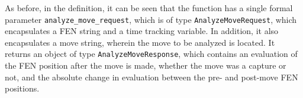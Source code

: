 As before, in the definition, it can be seen that the function has a single formal parameter
\texttt{analyze\_move\_request}, which is of type \texttt{AnalyzeMoveRequest}, which encapsulates a FEN string and a
time tracking variable.
In addition, it also encapsulates a move string, wherein the move to be analyzed is located.
It returns an object of type \texttt{AnalyzeMoveResponse}, which contains an evaluation of the FEN position after the
move is made, whether the move was a capture or not, and the absolute change in evaluation between the pre- and
post-move FEN positions.
